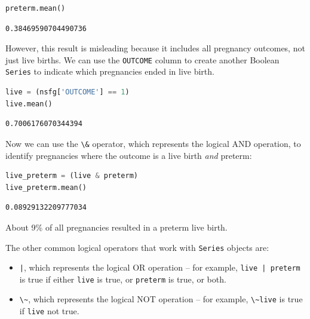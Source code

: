 \documentclass[
]{book}
\newcommand{\passthrough}[1]{#1}
\begin{document}
\begin{lstlisting}[language=Python]
preterm.mean()
\end{lstlisting}

\begin{lstlisting}
0.38469590704490736
\end{lstlisting}

However, this result is misleading because it includes all pregnancy
outcomes, not just live births. We can use the
\passthrough{\lstinline!OUTCOME!} column to create another Boolean
\passthrough{\lstinline!Series!} to indicate which pregnancies ended in
live birth.

\begin{lstlisting}[language=Python]
live = (nsfg['OUTCOME'] == 1)
live.mean()
\end{lstlisting}

\begin{lstlisting}
0.7006176070344394
\end{lstlisting}

Now we can use the \passthrough{\lstinline!\&!} operator, which
represents the logical AND operation, to identify pregnancies where the
outcome is a live birth \emph{and} preterm:

\begin{lstlisting}[language=Python]
live_preterm = (live & preterm)
live_preterm.mean()
\end{lstlisting}

\begin{lstlisting}
0.08929132209777034
\end{lstlisting}

About 9\% of all pregnancies resulted in a preterm live birth.

The other common logical operators that work with
\passthrough{\lstinline!Series!} objects are:

\begin{itemize}
\item
  \passthrough{\lstinline!|!}, which represents the logical OR operation
  -- for example, \passthrough{\lstinline!live | preterm!} is true if
  either \passthrough{\lstinline!live!} is true, or
  \passthrough{\lstinline!preterm!} is true, or both.
\item
  \passthrough{\lstinline!\~!}, which represents the logical NOT
  operation -- for example, \passthrough{\lstinline!\~live!} is true if
  \passthrough{\lstinline!live!} not true.
\end{itemize}
\end{document}
